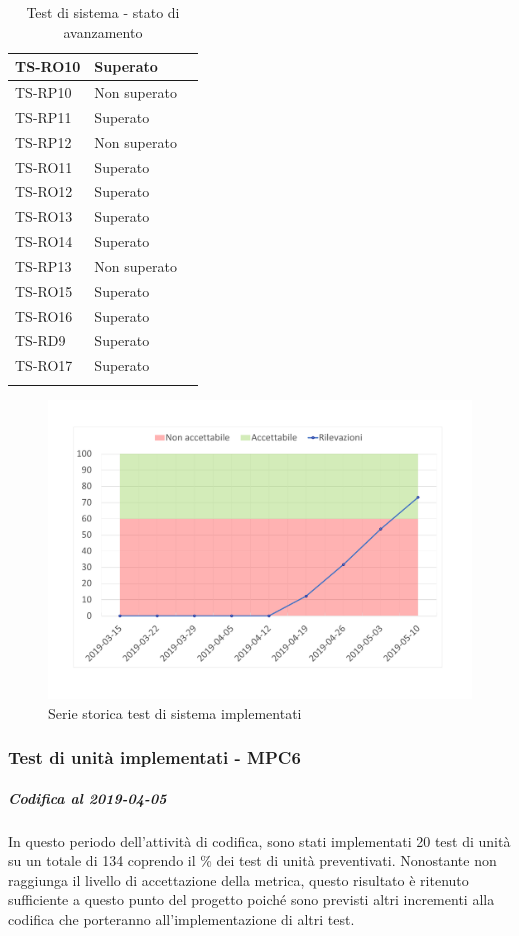 \begin{longtable}{|>{\centering\arraybackslash}m{1.6cm}|>{\centering\arraybackslash}m{6.41cm}|>{\centering\arraybackslash}m{3.1cm}|}
		\rowcolor{LightGray}
		TS-RO10
		& Superato
		\\ \hline
		TS-RP10		
		& Non superato
		\\ \hline
		\rowcolor{LightGray}
		TS-RP11		
		& Superato
		\\ \hline
		TS-RP12		
		& Non superato
		\\ \hline	
		\rowcolor{LightGray}
		TS-RO11	
		& Superato
		\\ \hline
		TS-RO12	
		& Superato
		\\ \hline
		\rowcolor{LightGray}
		TS-RO13
		& Superato
		\\ \hline
		TS-RO14
		& Superato
		\\ \hline
		\rowcolor{LightGray}
		TS-RP13
		& Non superato
		\\ \hline
		TS-RO15
		& Superato
		\\ \hline
		\rowcolor{LightGray}
		TS-RO16	
		& Superato
		\\ \hline
		TS-RD9
		& Superato
		\\ \hline
		\rowcolor{LightGray}
		TS-RO17
		& Superato
		\\ \hline
		
		\caption{Test di sistema - stato di avanzamento}
\end{longtable}

\begin{figure}[H]
	\centering
	\includegraphics[scale=0.6]{images/resoconto/MPC5Chart.pdf}
	\caption{Serie storica test di sistema implementati}	
\end{figure}
\subsubsection{Test di unità implementati - MPC6}
\subparagraph{Codifica al 2019-04-05}
In questo periodo dell'attività di codifica, sono stati implementati 20 test di unità su un totale di 134 coprendo il \% dei test di unità preventivati.
Nonostante non raggiunga il livello di accettazione della
metrica, questo risultato è ritenuto sufficiente a questo punto del progetto poiché sono previsti altri incrementi alla codifica che porteranno all'implementazione di altri test.

